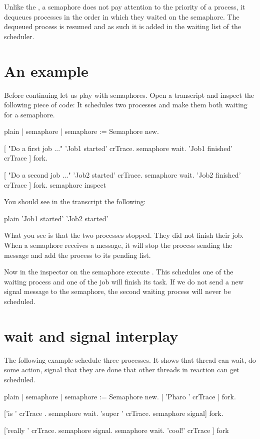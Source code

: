 \documentclass[10pt,twoside,english]{_support/latex/sbabook/sbabook}
\begin{document}
Unlike the , a semaphore does not pay attention to the priority of a process, it dequeues processes in the order in which they waited on the semaphore.
The dequeued process is resumed and as such it is added in the waiting list of the scheduler.
\section{An example}
Before continuing let us play with semaphores.
Open a transcript and inspect the following piece of code: It schedules two processes and make them both waiting for a semaphore. 

\begin{displaycode}{plain}
| semaphore |
semaphore := Semaphore new.

[ "Do a first job ..."
	'Job1 started' crTrace.
	semaphore wait. 
	'Job1 finished' crTrace
	] fork.

[ "Do a second job ..."
	'Job2 started' crTrace.
	semaphore wait. 
	'Job2 finished' crTrace
	] fork.
semaphore inspect
\end{displaycode}

You should see in the transcript the following:

\begin{displaycode}{plain}
'Job1 started'
'Job2 started'
\end{displaycode}

What you see is that the two processes stopped. They did not finish their job. 
When a semaphore receives a  message, it will stop the process sending the message and add the process to its pending list. 

Now in the inspector on the semaphore execute .
This schedules one of the waiting process and one of the job will finish its task.
If we do not send a new signal message to the semaphore, the second waiting process will never be scheduled.
\section{wait and signal interplay}
The following example schedule three processes. It shows that thread can wait, do some action, signal that they are done that other threads in reaction can get scheduled.

\begin{displaycode}{plain}
| semaphore |
semaphore := Semaphore new. 
[ 'Pharo ' crTrace ] fork. 

['is ' crTrace .
semaphore wait.
'super ' crTrace. 
semaphore signal] fork.

['really ' crTrace. 
semaphore signal.
semaphore wait.
'cool!' crTrace ] fork
\end{displaycode}
\end{document}
